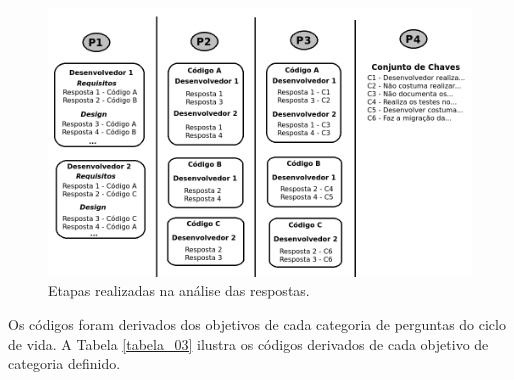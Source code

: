 \begin{figure}[h]
\hspace*{-1.5cm}
		\includegraphics[scale=0.7]{figuras/Esquematico_Analise_2}
	\caption{Etapas realizadas na análise das respostas.}
	\label{etapas_analise_respostas}
\end{figure}

Os códigos foram derivados dos objetivos de cada categoria de perguntas do ciclo de vida. A Tabela \ref{tabela_03} ilustra os códigos derivados de cada objetivo de categoria definido.

